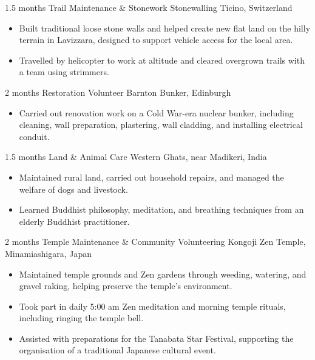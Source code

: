 \documentclass[9pt]{developercv} %
\begin{document}
	\begin{entrylist}

		\entry
			{1.5 months}
			{Trail Maintenance \& Stonework}
			{Stonewalling Ticino, Switzerland}
			{
				\begin{itemize}
					\item[$\bullet$\hspace*{0.5cm}] Built traditional loose stone walls and helped create new flat land on the hilly terrain in Lavizzara, designed to support vehicle access for the local area.
					\item[$\bullet$\hspace*{0.5cm}] Travelled by helicopter to work at altitude and cleared overgrown trails with a team using strimmers.
				\end{itemize}
			}

		\entry
			{2 months}
			{Restoration Volunteer}
			{Barnton Bunker, Edinburgh}
			{
				\begin{itemize}
					\item[$\bullet$\hspace*{0.5cm}] Carried out renovation work on a Cold War-era nuclear bunker, including cleaning, wall preparation, plastering, wall cladding, and installing electrical conduit.
				\end{itemize}
			}

		\entry
			{1.5 months}
			{Land \& Animal Care}
			{Western Ghats, near Madikeri, India}
			{
				\begin{itemize}
					\item[$\bullet$\hspace*{0.5cm}] Maintained rural land, carried out household repairs, and managed the welfare of dogs and livestock.
					\item[$\bullet$\hspace*{0.5cm}] Learned Buddhist philosophy, meditation, and breathing techniques from an elderly Buddhist practitioner.
				\end{itemize}
			}


		\entry
			{2 months}
			{Temple Maintenance \& Community Volunteering}
			{Kongoji Zen Temple, Minamiashigara, Japan}
			{
				\begin{itemize}
					\item[$\bullet$\hspace*{0.5cm}] Maintained temple grounds and Zen gardens through weeding, watering, and gravel raking, helping preserve the temple's environment.
					\item[$\bullet$\hspace*{0.5cm}] Took part in daily 5:00 am Zen meditation and morning temple rituals, including ringing the temple bell.
					\item[$\bullet$\hspace*{0.5cm}] Assisted with preparations for the Tanabata Star Festival, supporting the organisation of a traditional Japanese cultural event.
				\end{itemize}
			}

	\end{entrylist}
\end{document}
